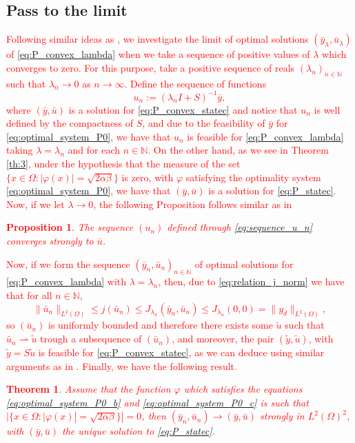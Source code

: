 \documentclass[11pt,a4paper]{amsart}
\newcommand{\om}{\Omega}
\newtheorem{proposition}{{Proposition}}
\newtheorem{theorem}{{Theorem}}
\newcommand{\norm}[1]{\lVert #1 \rVert}
\begin{document}
\subsection{Pass to the limit} \textcolor{red}{Following similar ideas as \cite{meyprftro07}, we investigate the limit of optimal solutions $(\bar y_{\lambda}, \bar u_{\lambda})$ of \eqref{eq:P_convex_lambda} when we take a sequence of positive values of $\lambda$ which converges to zero. For this purpose, take a positive sequence of reals $(\lambda_{n})_{n\in\mathbb{N}}$ such that $\lambda_n\to 0$ as $n\to\infty$. Define the sequence of functions
\begin{equation}\label{eq:sequence_u_n}
    u_n:=(\lambda_n I+S)^{-1}\bar y,
\end{equation}
where $(\bar y, \bar u)$ is a solution for \eqref{eq:P_convex_statec} and notice that $u_n$ is well defined by the compactness of $S$, and due to the feasibility of $\bar y$ for \eqref{eq:optimal_system_P0}, we have that $u_n$ is feasible for \eqref{eq:P_convex_lambda} taking $\lambda=\lambda_n$ and for each $n\in\mathbb{N}$. On the other hand, as we see in Theorem \ref{th:3}, under the hypothesis that the measure of the set $\{x\in\om: |\varphi(x)|=\sqrt{2\alpha\beta}\}$ is zero, with $\varphi$ satisfying the optimality system \eqref{eq:optimal_system_P0}, we have that $(\bar y, \bar u)$ is a solution for \eqref{eq:P_statec}. Now, if we let $\lambda\to 0$, the following Proposition follows similar as in \cite[Lemma 3.1]{meyprftro07}
\begin{proposition}
    The sequence $(u_n)$ defined through \eqref{eq:sequence_u_n} converges strongly to $\bar u$.
\end{proposition}
Now, if we form the sequence $(\bar y_n, \bar u_n)_{n\in\mathbb{N}}$ of optimal solutions for \eqref{eq:P_convex_lambda} with $\lambda=\lambda_n$, then, due to \eqref{eq:relation_j_norm} we have that for all $n\in\mathbb{N}$,
\[
\norm{\bar u_n}_{L^2(\om)}\le j(\bar u_n)\le J_{\lambda_n}(\bar y_n,\bar u_n)\le J_{\lambda_n}(0,0)=\norm{y_d}_{L^2(\om)},
\]
so $(\bar u_n)$ is uniformly bounded and therefore there exists some $\tilde u$ such that $\bar u_{n}\rightharpoonup\widetilde u$ trough a subsequence of $(\bar u_n)$, and moreover, the pair $(\tilde y,\tilde u)$, with $\widetilde y= S\widetilde u$ is feasible for \eqref{eq:P_convex_statec}, as we can deduce using similar arguments as in \cite[Lemma 3.2]{meyprftro07}. Finally, we have the following result.
\begin{theorem}
    Assume that the function $\varphi$ which satisfies the equations \eqref{eq:optimal_system_P0_b} and \eqref{eq:optimal_system_P0_c} is such that $|\{x\in\om: |\varphi(x)|=\sqrt{2\alpha\beta}\}|=0$, then $(\bar y_n,\bar u_n)\to (\bar y,\bar u)$ strongly in $L^2(\om)^2$, with $(\bar y, \bar u)$ the unique solution to \eqref{eq:P_statec}.  

\end{theorem}}
\end{document}

